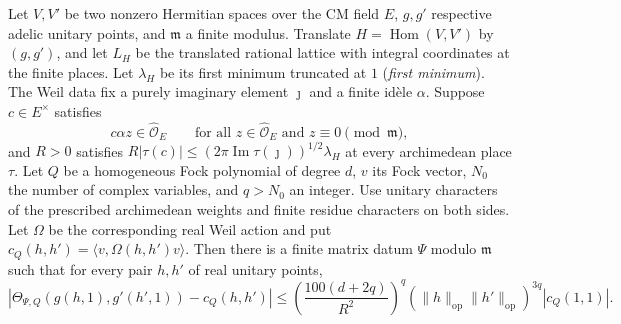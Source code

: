 \begin{lemma}
\label{lem:c-kernel-sparse-average}
\emitthmsource
Let $V,V'$ be two nonzero Hermitian spaces over the CM field $E$, $g,g'$ respective adelic unitary points, and $\mathfrak m$ a finite modulus. Translate $H=\operatorname{Hom}(V,V')$ by $(g,g')$, and let $L_H$ be the translated rational lattice with integral coordinates at the finite places. Let $\lambda_H$ be its first minimum truncated at $1$ (\emph{first minimum}). The Weil data fix a purely imaginary element $\jmath{}$ and a finite idèle $\alpha$. Suppose $c\in E^\times$ satisfies
\[
 c\alpha z\in\widehat{\mathcal O}_E
 \qquad\text{for all }z\in\widehat{\mathcal O}_E
                  \text{ and }z\equiv0\pmod{\mathfrak m},
\]
and $R>0$ satisfies $R|\tau(c)|\le (2\pi\operatorname{Im}\tau(\jmath{}))^{1/2}\lambda_H$ at every archimedean place $\tau$. Let $Q$ be a homogeneous Fock polynomial of degree $d$, $v$ its Fock vector, $N_0$ the number of complex variables, and $q>N_0$ an integer. Use unitary characters of the prescribed archimedean weights and finite residue characters on both sides. Let $\Omega$ be the corresponding real Weil action and put $c_Q(h,h')=\langle v,\Omega(h,h')v\rangle$. Then there is a finite matrix datum $\Psi$ modulo $\mathfrak m$ such that for every pair $h,h'$ of real unitary points,
\[
 \left|\Theta_{\Psi,Q}(g(h,1),g'(h',1))-c_Q(h,h')\right|
 \le
 \left(\frac{100(d+2q)}{R^2}\right)^q
 (\|h\|_{\mathrm{op}}\|h'\|_{\mathrm{op}})^{3q}|c_Q(1,1)|.
\]
\end{lemma}

